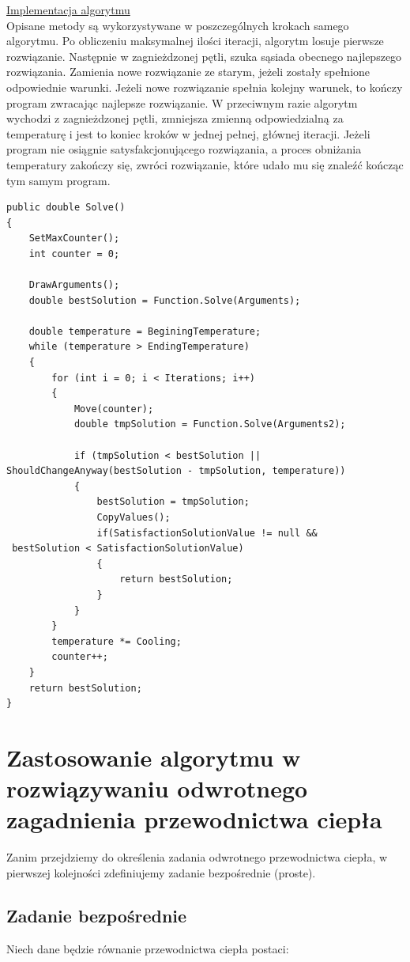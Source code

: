\documentclass[twoside]{projektInzynierskiMS1}
\newcommand{\si}{ś}
\begin{document}
\underline{Implementacja algorytmu} \\
Opisane metody są wykorzystywane w poszczególnych krokach samego algorytmu. Po obliczeniu maksymalnej ilo\si ci iteracji, algorytm losuje pierwsze rozwiązanie. Następnie w zagnieżdzonej pętli, szuka sąsiada obecnego najlepszego rozwiązania. Zamienia nowe rozwiązanie ze starym, jeżeli zostały spełnione odpowiednie warunki. Jeżeli nowe rozwiązanie spełnia kolejny warunek, to kończy program zwracając najlepsze rozwiązanie. W przeciwnym razie algorytm wychodzi z zagnieżdzonej pętli, zmniejsza zmienną odpowiedzialną za temperaturę i jest to koniec kroków w jednej pełnej, głównej iteracji. Jeżeli program nie osiągnie satysfakcjonującego rozwiązania, a proces obniżania temperatury zakończy się, zwróci rozwiązanie, które udało mu się znaleźć kończąc tym samym program.

\begin{verbatim}
public double Solve()
{
    SetMaxCounter();
    int counter = 0;

    DrawArguments();
    double bestSolution = Function.Solve(Arguments);

    double temperature = BeginingTemperature;
    while (temperature > EndingTemperature)
    {
        for (int i = 0; i < Iterations; i++)
        {
            Move(counter);
            double tmpSolution = Function.Solve(Arguments2);

            if (tmpSolution < bestSolution || 
ShouldChangeAnyway(bestSolution - tmpSolution, temperature))
            {
                bestSolution = tmpSolution;
                CopyValues();
                if(SatisfactionSolutionValue != null &&
 bestSolution < SatisfactionSolutionValue)
                {
                    return bestSolution;
                }
            }
        }
        temperature *= Cooling;
        counter++;
    }
    return bestSolution;
}
\end{verbatim}

\section[Odwrotne zagadnienie przewodnictwa ciepła]{Zastosowanie algorytmu w rozwiązywaniu odwrotnego zagadnienia przewodnictwa ciepła}

Zanim przejdziemy do określenia zadania odwrotnego przewodnictwa ciepła, w pierwszej kolejności zdefiniujemy zadanie bezpośrednie (proste).

\subsection{Zadanie bezpo\si rednie}
Niech dane będzie równanie przewodnictwa ciepła postaci:
\end{document}
